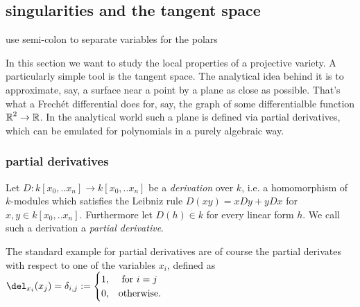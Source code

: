 \subsection{singularities and the tangent space}

\begin{todo}
\item use semi-colon to separate variables for the polars
\end{todo}

In this section we want to study the local properties of a projective variety.
A particularly simple tool is the tangent space.
The analytical idea behind it is to approximate, say, a surface near a point by a plane as close as possible.
That's what a Frechét differential does for, say,  the graph of some differentialble function $\operatorname{\mathbb R}^2 \to \operatorname{\mathbb R}$.
In the analytical world such a plane is defined via partial derivatives, which can be emulated for polynomials in a purely algebraic way.

\subsubsection{partial derivatives}
\begin{definition}
Let $D : k[x_0,..x_n] \to k[x_0,..x_n]$ be a \emph{derivation} over $k$, i.e. a homomorphism of $k$-modules which satisfies the Leibniz rule $D(xy) = xDy+yDx$ for $x,y \in k[x_0,..x_n]$. Furthermore let $D(h) \in k$ for every linear form $h$. We call such a derivation a \emph{partial derivative}.
\end{definition}

\begin{example}
The standard example for partial derivatives are of course the partial derivates with respect to one of the variables $x_i$, defined as $\del_{x_i}(x_j) = \delta_{i,j} := \begin{cases} 1, & \text{ for } i = j \\ 0, & \text {otherwise.} \end{cases}$
\end{example}

